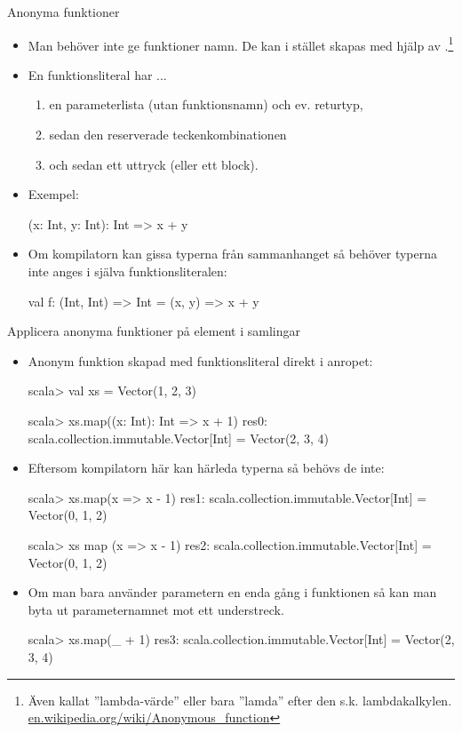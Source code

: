 \begin{Slide}{Anonyma funktioner}
\begin{itemize}
\item  Man behöver inte ge funktioner namn. De kan i stället skapas med hjälp av .\footnote{Även kallat ''lambda-värde'' eller bara ''lamda'' efter den s.k. lambdakalkylen. \href{https://en.wikipedia.org/wiki/Anonymous_function}{en.wikipedia.org/wiki/Anonymous\_function}}

\item En funktionsliteral har ...
\begin{enumerate}
\item en parameterlista (utan funktionsnamn) och ev. returtyp, \item sedan den reserverade teckenkombinationen \code{=>} \item och sedan ett uttryck (eller ett block).
\end{enumerate}
\item Exempel:
\begin{Code}[basicstyle=\ttfamily\fontsize{10}{12}\selectfont]
(x: Int, y: Int): Int => x + y
\end{Code}
\pause
\item Om kompilatorn kan gissa typerna från sammanhanget så behöver typerna inte anges i själva  funktionsliteralen:
\begin{Code}[basicstyle=\ttfamily\fontsize{10}{12}\selectfont]
val f: (Int, Int) => Int = (x, y) => x + y
\end{Code}

\end{itemize}
\end{Slide}


\begin{Slide}{Applicera anonyma funktioner på element i samlingar}\SlideFontSmall
\begin{itemize}
\item Anonym funktion skapad med funktionsliteral direkt i anropet:
\begin{REPL}
scala> val xs = Vector(1, 2, 3)

scala> xs.map((x: Int): Int => x + 1)
res0: scala.collection.immutable.Vector[Int] = Vector(2, 3, 4)
\end{REPL}
\item Eftersom kompilatorn här kan härleda typerna så behövs de inte:
\begin{REPL}
scala> xs.map(x => x - 1)
res1: scala.collection.immutable.Vector[Int] = Vector(0, 1, 2)

scala> xs map (x => x - 1)
res2: scala.collection.immutable.Vector[Int] = Vector(0, 1, 2)

\end{REPL}
\item Om man bara använder parametern en enda gång i funktionen så kan man byta ut parameternamnet mot ett understreck.

\begin{REPL}
scala> xs.map(_ + 1)
res3: scala.collection.immutable.Vector[Int] = Vector(2, 3, 4)
\end{REPL}
\end{itemize}
\end{Slide} 



